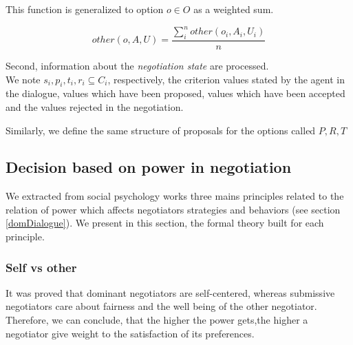\documentclass{llncs}
\begin{document}
	This function is generalized to option $o \in O$ as a weighted sum.
	
	\begin{equation}
	other(o, A, U) = \frac{ \sum_{i}^{n} other(o_i, A_i, U_i) } {n}
	\end{equation}
	
	Second, information about the \textit{negotiation state} are processed. \\
	We note  $s_i, p_i, t_i, r_i \subseteq C_i$, respectively, the criterion values stated by the agent in the dialogue, values which have been proposed, values which have been accepted and the values rejected in the negotiation. 
		
	Similarly, we define the same structure of proposals for the options called $P, R, T$
	
	\subsection{Decision based on power in negotiation}
	\label{decision}
	We extracted from social psychology works three mains principles related to the relation of power which affects negotiators strategies and behaviors (see section \ref{domDialogue}). We present in this section, the formal theory built for each principle. 
	
	\subsubsection {Self vs other}
		It was proved that dominant negotiators are self-centered, whereas submissive negotiators care about fairness and the well being of the other negotiator. Therefore, we can conclude, that the higher the power gets,the higher a negotiator give weight to the satisfaction of its preferences.
	
\end{document}
